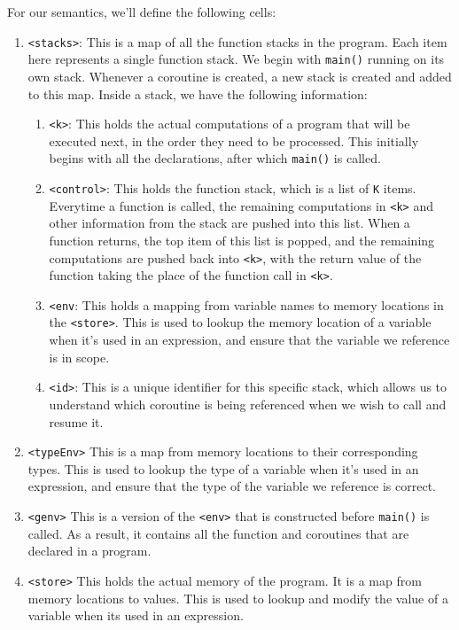 \documentclass[review,twocolumn]{sigplanconf}
\begin{document}
For our semantics, we'll define the following cells:
\begin{enumerate}
  \item \verb!<stacks>!: This is a map of all the function stacks in the program. Each item here represents a single function stack. We begin with \verb!main()! running on its own stack. Whenever a coroutine is created, a new stack is created and added to this map. Inside a stack, we have the following information: \begin{enumerate}
          \item \verb!<k>!: This holds the actual computations of a program that will be executed next, in the order they need to be processed. This initially begins with all the declarations, after which \verb!main()! is called.
          \item \verb!<control>!: This holds the function stack, which is a list of \verb!K! items. Everytime a function is called, the remaining computations in \verb!<k>! and other information from the stack are pushed into this list. When a function returns, the top item of this list is popped, and the remaining computations are pushed back into \verb!<k>!, with the return value of the function taking the place of the function call in \verb!<k>!.
          \item \verb!<env!: This holds a mapping from variable names to memory locations in the \verb!<store>!. This is used to lookup the memory location of a variable when it's used in an expression, and ensure that the variable we reference is in scope.
          \item \verb!<id>!: This is a unique identifier for this specific stack, which allows us to understand which coroutine is being referenced when we wish to call and resume it.
        \end{enumerate}
  \item \verb!<typeEnv>! This is a map from memory locations to their corresponding types. This is used to lookup the type of a variable when it's used in an expression, and ensure that the type of the variable we reference is correct.
  \item \verb!<genv>! This is a version of the \verb!<env>! that is constructed before \verb!main()! is called. As a result, it contains all the function and coroutines that are declared in a program.
  \item \verb!<store>! This holds the actual memory of the program. It is a map from memory locations to values. This is used to lookup and modify the value of a variable when its used in an expression.

\end{enumerate}
\end{document}
